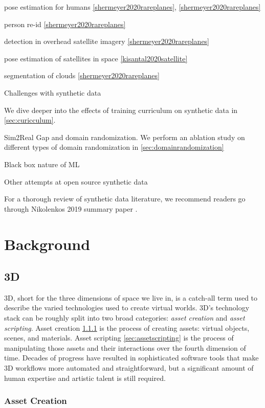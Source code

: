 \documentclass{article}
\begin{document}
pose estimation for humans \ref{shermeyer2020rareplanes}, \ref{shermeyer2020rareplanes}

person re-id \ref{shermeyer2020rareplanes}

detection in overhead satellite imagery \ref{shermeyer2020rareplanes}

pose estimation of satellites in space \ref{kisantal2020satellite}

segmentation of clouds \ref{shermeyer2020rareplanes}

Challenges with synthetic data

We dive deeper into the effects of training curriculum on synthetic data in \ref{sec:curicculum}.

Sim2Real Gap and domain randomization. We perform an ablation study on different types of domain randomization in \ref{sec:domainrandomization}

Black box nature of ML

Other attempts at open source synthetic data \cite{denninger2019blenderproc} \cite{bpycv}

For a thorough review of synthetic data literature, we recommend readers go through Nikolenkos 2019 summary paper \cite{nikolenko2019synthetic}.

\section{Background}
\label{sec:background}

\subsection{3D}
\label{sec:3d}

3D, short for the three dimensions of space we live in, is a catch-all term used to describe the varied technologies used to create virtual worlds. 3D’s technology stack can be roughly split into two broad categories: \emph{asset creation} and \emph{asset scripting}. Asset creation \ref{sec:assetcreation} is the process of creating assets: virtual objects, scenes, and materials. Asset scripting \ref{sec:assetscripting} is the process of manipulating those assets and their interactions over the fourth dimension of time. Decades of progress have resulted in sophisticated software tools that make 3D workflows more automated and straightforward, but a significant amount of human expertise and artistic talent is still required.

\subsubsection{Asset Creation}
\label{sec:assetcreation}
\end{document}
